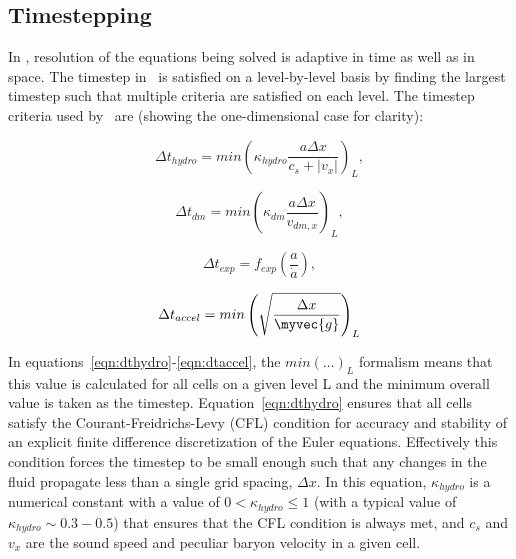 
\subsection{Timestepping}\label{sec.timestepping}
In \enzo, resolution of the equations being solved is adaptive in time 
as well as in space.  The timestep in \enzo\ is satisfied on a level-by-level
 basis by finding the largest timestep such that multiple criteria are
satisfied on each level.  The timestep criteria used by \enzo\ are 
(showing the one-dimensional case for clarity):

\begin{equation}
\Delta t_{hydro} = min \left( \kappa_{hydro} \frac{a \Delta x}{c_{s} + |v_x|} \right)_L ,
\label{eqn:dthydro}
\end{equation}

\begin{equation}
\Delta t_{dm} = min \left(\kappa_{dm} \frac{a \Delta x}{v_{dm,x}} \right)_L ,
\label{eqn:dtdarkmatter}
\end{equation}

\begin{equation}
\Delta t_{exp} = f_{exp} \left( \frac{a}{\dot{a}} \right) ,
\label{eqn:dtexpand}
\end{equation}

\begin{equation}
\Delta t_{accel} = min \left( \sqrt{\frac{\Delta x}{\myvec{g}}} \right)_L 
\label{eqn:dtaccel}
\end{equation}

 In equations~\ref{eqn:dthydro}-\ref{eqn:dtaccel}, the $min ( \ldots )_L$
formalism means that this value is calculated for all cells on a given level
L and the minimum overall value is taken as the timestep.  
Equation~\ref{eqn:dthydro} ensures that all cells satisfy the 
Courant-Freidrichs-Levy (CFL) condition for accuracy and stability of an explicit
finite difference discretization of the Euler equations.  Effectively this condition
forces the timestep to be small enough such that any changes in the fluid propagate
less than a single grid spacing, $\Delta x$.  In this equation, $\kappa_{hydro}$ is 
a numerical constant with a value of $0 < \kappa_{hydro} \leq 1$ (with a typical
value of $\kappa_{hydro} \sim 0.3-0.5$) that ensures that the CFL condition is always
met, and $c_s$ and $v_x$ are the sound speed and peculiar baryon
velocity in a given cell.

